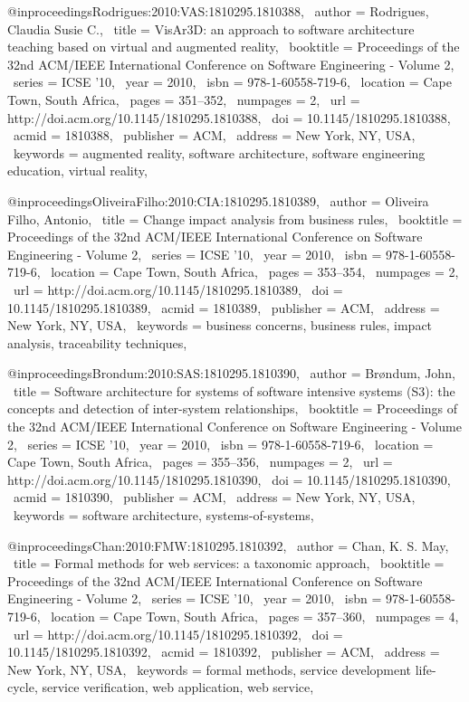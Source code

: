 @inproceedings{Rodrigues:2010:VAS:1810295.1810388,
 author = {Rodrigues, Claudia Susie C.},
 title = {VisAr3D: an approach to software architecture teaching based on virtual and augmented reality},
 booktitle = {Proceedings of the 32nd ACM/IEEE International Conference on Software Engineering - Volume 2},
 series = {ICSE '10},
 year = {2010},
 isbn = {978-1-60558-719-6},
 location = {Cape Town, South Africa},
 pages = {351--352},
 numpages = {2},
 url = {http://doi.acm.org/10.1145/1810295.1810388},
 doi = {10.1145/1810295.1810388},
 acmid = {1810388},
 publisher = {ACM},
 address = {New York, NY, USA},
 keywords = {augmented reality, software architecture, software engineering education, virtual reality},
} 

@inproceedings{OliveiraFilho:2010:CIA:1810295.1810389,
 author = {Oliveira Filho, Antonio},
 title = {Change impact analysis from business rules},
 booktitle = {Proceedings of the 32nd ACM/IEEE International Conference on Software Engineering - Volume 2},
 series = {ICSE '10},
 year = {2010},
 isbn = {978-1-60558-719-6},
 location = {Cape Town, South Africa},
 pages = {353--354},
 numpages = {2},
 url = {http://doi.acm.org/10.1145/1810295.1810389},
 doi = {10.1145/1810295.1810389},
 acmid = {1810389},
 publisher = {ACM},
 address = {New York, NY, USA},
 keywords = {business concerns, business rules, impact analysis, traceability techniques},
} 

@inproceedings{Brondum:2010:SAS:1810295.1810390,
 author = {Br{\o}ndum, John},
 title = {Software architecture for systems of software intensive systems (S3): the concepts and detection of inter-system relationships},
 booktitle = {Proceedings of the 32nd ACM/IEEE International Conference on Software Engineering - Volume 2},
 series = {ICSE '10},
 year = {2010},
 isbn = {978-1-60558-719-6},
 location = {Cape Town, South Africa},
 pages = {355--356},
 numpages = {2},
 url = {http://doi.acm.org/10.1145/1810295.1810390},
 doi = {10.1145/1810295.1810390},
 acmid = {1810390},
 publisher = {ACM},
 address = {New York, NY, USA},
 keywords = {software architecture, systems-of-systems},
} 

@inproceedings{Chan:2010:FMW:1810295.1810392,
 author = {Chan, K. S. May},
 title = {Formal methods for web services: a taxonomic approach},
 booktitle = {Proceedings of the 32nd ACM/IEEE International Conference on Software Engineering - Volume 2},
 series = {ICSE '10},
 year = {2010},
 isbn = {978-1-60558-719-6},
 location = {Cape Town, South Africa},
 pages = {357--360},
 numpages = {4},
 url = {http://doi.acm.org/10.1145/1810295.1810392},
 doi = {10.1145/1810295.1810392},
 acmid = {1810392},
 publisher = {ACM},
 address = {New York, NY, USA},
 keywords = {formal methods, service development life-cycle, service verification, web application, web service},
} 

